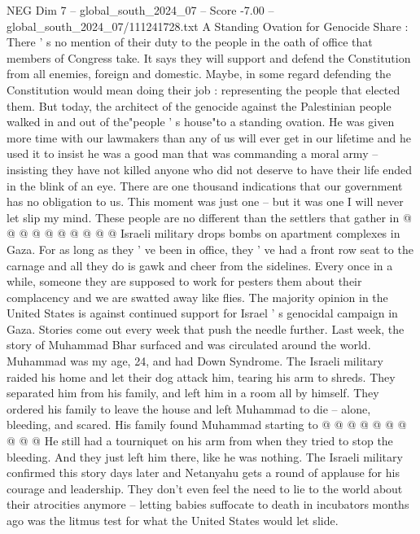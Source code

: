 \begin{textsample}{NEG Dim 7 – global\_south\_2024\_07 – Score -7.00 – global\_south\_2024\_07/111241728.txt}  \label{ex:f7_neg_332}
A Standing Ovation for Genocide Share : There ' s no mention of their duty to the people in the oath of office that members of Congress take.
It says they will support and defend the Constitution from all enemies, foreign and domestic.
Maybe, in some regard defending the Constitution would mean doing their job : representing the people that elected them.
But today, the architect of the genocide against the Palestinian people walked in and out of the"people ' s house"to a standing ovation.
He was given more time with our lawmakers than any of us will ever get in our lifetime and he used it to insist he was a good man that was commanding a moral army -- insisting they have not killed anyone who did not deserve to have their life ended in the blink of an eye.
There are one thousand indications that our government has no obligation to us.
This moment was just one -- but it was one I will never let slip my mind.
These people are no different than the settlers that gather in @ @ @ @ @ @ @ @ @ @ Israeli military drops bombs on apartment complexes in Gaza.
For as long as they ' ve been in office, they ' ve had a front row seat to the carnage and all they do is gawk and cheer from the sidelines.
Every once in a while, someone they are supposed to work for pesters them about their complacency and we are swatted away like flies.
The majority opinion in the United States is against continued support for Israel ' s genocidal campaign in Gaza.
Stories come out every week that push the needle further.
Last week, the story of Muhammad Bhar surfaced and was circulated around the world.
Muhammad was my age, 24, and had Down Syndrome.
The Israeli military raided his home and let their dog attack him, tearing his arm to shreds.
They separated him from his family, and left him in a room all by himself.
They ordered his family to leave the house and left Muhammad to die -- alone, bleeding, and scared.
His family found Muhammad starting to @ @ @ @ @ @ @ @ @ @ He still had a tourniquet on his arm from when they tried to stop the bleeding.
And they just left him there, like he was nothing.
The Israeli military confirmed this story days later and Netanyahu gets a round of applause for his courage and leadership.
They don't even feel the need to lie to the world about their atrocities anymore -- letting babies suffocate to death in incubators months ago was the litmus test for what the United States would let slide.

\end{textsample}
